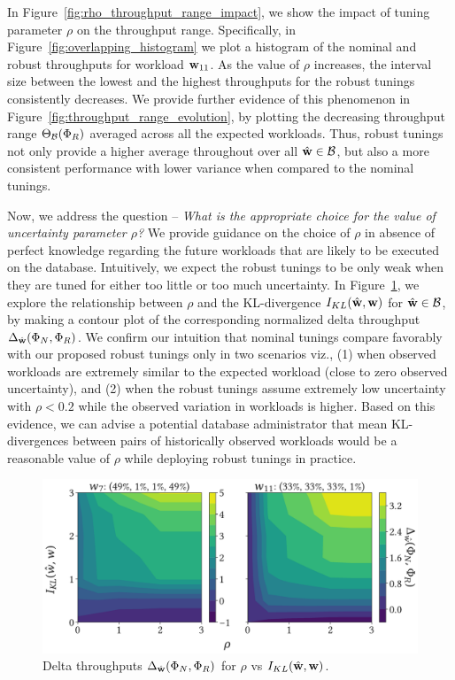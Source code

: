 In Figure~\ref{fig:rho_throughput_range_impact}, we show the impact of tuning
    parameter $\rho$ on the throughput range.
Specifically, in Figure~\ref{fig:overlapping_histogram} we plot a histogram of 
    the nominal and robust throughputs for workload ${{\bf{w}}}_{11}$. 
As the value of $\rho$ increases, the interval size between the lowest and the 
    highest throughputs for the robust tunings consistently decreases.
We provide further evidence of this phenomenon in 
    Figure~\ref{fig:throughput_range_evolution}, by plotting the decreasing  
    throughput range $\Theta_{{\mathcal{B}}}({{\Phi}}_R)$  
    averaged across all the expected workloads. 
Thus, robust tunings not only provide a higher average throughout over all 
    ${{\hat{\bf{w}}}} \in {{\ensuremath{\mathcal{B}}}}$, 
    but also a more consistent performance with lower variance when compared
    to the nominal tunings.

 Now, we address the question -- 
\emph{What is the appropriate choice for the value of uncertainty parameter $\rho$?}
We provide guidance on the choice of $\rho$ in absence of perfect knowledge
    regarding the future workloads that are likely to be executed on the
    database.
Intuitively, we expect the robust tunings to be only weak when they are tuned 
    for either too little or too much uncertainty.
In Figure~\ref{fig:rho_vs_rho_hat}, we explore the relationship between $\rho$
and the KL-divergence $I_{KL}({{\hat{\bf{w}}}}, {{\bf{w}}})$ for 
    ${{\hat{\bf{w}}}} \in {{\ensuremath{\mathcal{B}}}}$, 
    by making a contour plot of the corresponding normalized delta throughput
    $\Delta_{{{\hat{\bf{w}}}}}({{\Phi}}_N, {{\Phi}}_R)$.
We confirm our intuition that nominal tunings compare favorably with our
    proposed robust tunings only in two scenarios viz., (1) when observed workloads
    are extremely similar to the expected workload (close to zero observed 
    uncertainty),
    and (2) when the robust tunings assume extremely low uncertainty with 
    $\rho < 0.2$ while the observed variation in workloads is higher.
Based on this evidence, we can advise a potential database administrator that
    mean KL-divergences between pairs of historically observed workloads would
    be a reasonable value of $\rho$ while deploying robust tunings in practice.

\begin{figure}[h]
    \centering
    \includegraphics[scale=0.25]{figures/rho_vs_rho_hat.pdf}
    \caption{Delta throughputs $\Delta_{{{\hat{\bf{w}}}}}(\Phi_{N},
        \Phi_{R})$ for $\rho$ vs $I_{KL}({{\hat{\bf{w}}}}, {{\bf{w}}})$.}
    \label{fig:rho_vs_rho_hat}
\end{figure}
